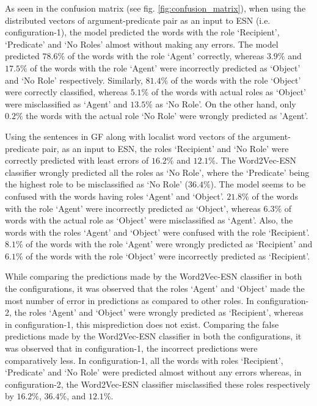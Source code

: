 As seen in the confusion matrix (see fig. \ref{fig:confusion_matrix}), when using the distributed vectors of argument-predicate pair as an input to ESN (i.e. configuration-1), the model predicted the words with the role `Recipient', `Predicate' and `No Roles' almost without making any errors. The model predicted $78.6 \%$ of the words with the role `Agent' correctly, whereas $3.9 \%$ and $17.5 \%$ of the words with the role `Agent' were incorrectly predicted as `Object' and `No Role' respectively. Similarly, $81.4 \%$ of the words with the role `Object' were correctly classified, whereas $ 5.1 \%$ of the words with actual roles as `Object' were misclassified as `Agent' and $13.5 \%$ as `No Role'. On the other hand, only $0.2 \%$ the words with the actual role `No Role' were wrongly predicted as 'Agent'. 

Using the sentences in GF along with localist word vectors of the argument-predicate pair, as an input to ESN, the roles `Recipient' and `No Role' were correctly predicted with least errors of $16.2 \%$ and $12.1 \%$. The Word2Vec-ESN classifier wrongly predicted all the roles as `No Role', where the `Predicate' being the highest role to be misclassified as `No Role' ($36.4 \%$). The model seems to be confused with the words having roles `Agent' and `Object'. $21.8 \%$ of the words with the role `Agent' were incorrectly predicted as `Object', whereas $6.3 \%$ of words with the actual role as `Object' were misclassified as `Agent'. Also, the words with the roles `Agent' and `Object' were confused with the role `Recipient'. $8.1 \%$ of the words with the role `Agent' were wrongly predicted as `Recipient' and $6.1 \%$ of the words with the role `Object' were incorrectly predicted as `Recipient'. 

While comparing the predictions made by the Word2Vec-ESN classifier in both the configurations, it was observed that the roles `Agent' and `Object' made the most number of error in predictions as compared to other roles. In configuration-2, the roles `Agent' and `Object' were wrongly predicted as `Recipient', whereas in configuration-1, this misprediction does not exist. Comparing the false predictions made by the Word2Vec-ESN classifier in both the configurations, it was observed that in configuration-1, the incorrect predictions were comparatively less. In configuration-1, all the words with roles `Recipient', `Predicate' and `No Role' were predicted almost without any errors whereas, in configuration-2, the Word2Vec-ESN classifier misclassified these roles respectively by $16.2 \%$, $36.4\%$, and $12.1 \%$.



